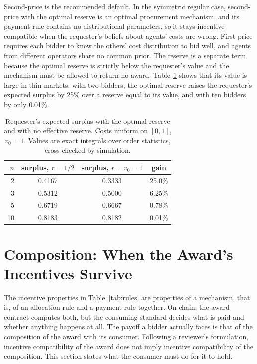 \documentclass[11pt]{article}
\theoremstyle{definition}
\theoremstyle{remark}
\begin{document}
Second-price is the recommended default. In the symmetric regular case, second-price with the optimal reserve is an optimal procurement mechanism, and its payment rule contains no distributional parameters, so it stays incentive compatible when the requester's beliefs about agents' costs are wrong. First-price requires each bidder to know the others' cost distribution to bid well, and agents from different operators share no common prior. The reserve is a separate term because the optimal reserve is strictly below the requester's value and the mechanism must be allowed to return no award. Table~\ref{tab:reserve} shows that its value is large in thin markets: with two bidders, the optimal reserve raises the requester's expected surplus by 25\% over a reserve equal to its value, and with ten bidders by only 0.01\%.

\begin{table}[t]
\centering
\small
\begin{tabular}{@{}rccc@{}}
\toprule
$n$ & surplus, $r = 1/2$ & surplus, $r = v_0 = 1$ & gain \\
\midrule
2 & 0.4167 & 0.3333 & 25.0\% \\
3 & 0.5312 & 0.5000 & 6.25\% \\
5 & 0.6719 & 0.6667 & 0.78\% \\
10 & 0.8183 & 0.8182 & 0.01\% \\
\bottomrule
\end{tabular}
\caption{Requester's expected surplus with the optimal reserve and with no effective reserve. Costs uniform on $[0,1]$, $v_0 = 1$. Values are exact integrals over order statistics, cross-checked by simulation.}
\label{tab:reserve}
\end{table}

\section{Composition: When the Award's Incentives Survive}
\label{sec:composition}

The incentive properties in Table~\ref{tab:rules} are properties of a mechanism, that is, of an allocation rule and a payment rule together. On-chain, the award contract computes both, but the consuming standard decides what is paid and whether anything happens at all. The payoff a bidder actually faces is that of the composition of the award with its consumer. Following a reviewer's formulation, incentive compatibility of the award does not imply incentive compatibility of the composition. This section states what the consumer must do for it to hold.
\end{document}
